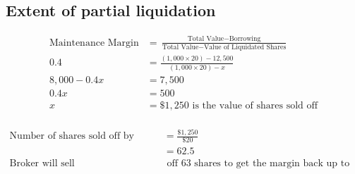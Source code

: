 \documentclass[12pt]{article}
\begin{document}
\subsection{Extent of partial liquidation}
\begin{align*}
	\text{Maintenance Margin} &=  \frac{\text{Total Value} - \text{Borrowing}}{\text{Total Value} - \text{Value of Liquidated Shares}} \\
	0.4 &= \frac{(1,000\times20) - 12,500}{(1,000\times20)-x} \\
	8,000 - 0.4x &= 7,500\\
	0.4x &= 500\\
	x &= \$1,250 \text{ is the value of shares sold off}\\
\end{align*}

\begin{flushleft}
\end{flushleft}

\begin{align*}
	\text{Number of shares sold off by broker} &= \frac{\$1,250}{\$20}\\
	&= 62.5\\
	\text{Broker will sell} &\text{ off 63 shares to get the margin back up to 40\%}
\end{align*}

\section{}
\subsection{}
\section{}
\section{}
\section{}
\end{document}
